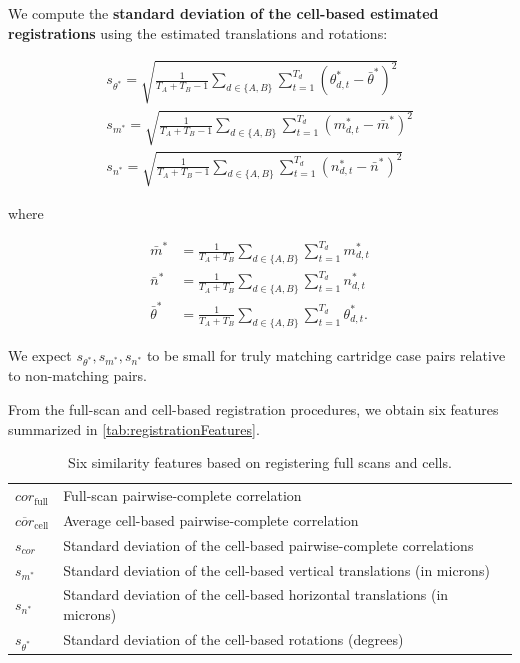 \documentclass[reprint]{JASA}
\begin{document}
We compute the \textbf{standard deviation of the cell-based estimated
registrations} using the estimated translations and rotations:

\begin{align*}
s_{\theta^*} =  \sqrt{\frac{1}{T_A + T_B - 1} \sum_{d \in \{A,B\}} \sum_{t=1}^{T_d} (\theta^*_{d,t} - \bar{\theta}^*)^2} \\
s_{m^*} =  \sqrt{\frac{1}{T_A + T_B - 1} \sum_{d \in \{A,B\}} \sum_{t=1}^{T_d} (m^*_{d,t} - \bar{m}^*)^2} \\
s_{n^*} = \sqrt{\frac{1}{T_A + T_B - 1} \sum_{d \in \{A,B\}} \sum_{t=1}^{T_d} (n^*_{d,t} - \bar{n}^*)^2}
\end{align*}

where

\begin{align*}
\bar{m}^* &= \frac{1}{T_A + T_B} \sum_{d \in \{A,B\}}\sum_{t=1}^{T_d} m^*_{d,t} \\
\bar{n}^* &= \frac{1}{T_A + T_B} \sum_{d \in \{A,B\}} \sum_{t=1}^{T_d} n^*_{d,t} \\
\bar{\theta}^* &= \frac{1}{T_A + T_B} \sum_{d \in \{A,B\}} \sum_{t=1}^{T_d} \theta^*_{d,t}.
\end{align*}

We expect \(s_{\theta^*}, s_{m^*},s_{n^*}\) to be small for truly
matching cartridge case pairs relative to non-matching pairs.

From the full-scan and cell-based registration procedures, we obtain six
features summarized in \autoref{tab:registrationFeatures}.

\begin{table}[htbp]
\centering
\begin{tabular}{p{.11\linewidth} p{.7\linewidth}}
$cor_{\text{full}}$ & Full-scan pairwise-complete correlation \\
$\overline{cor}_{\text{cell}}$ & Average cell-based pairwise-complete correlation \\
$s_{cor}$ & Standard deviation of the cell-based pairwise-complete correlations \\
$s_{m^*}$ & Standard deviation of the cell-based vertical translations (in microns) \\
$s_{n^*}$ & Standard deviation of the cell-based horizontal translations (in microns) \\
$s_{\theta^*}$ & Standard deviation of the cell-based rotations (degrees)
\end{tabular}
\caption{Six similarity features based on registering full scans and cells.}
\label{tab:registrationFeatures}
\end{table}
\end{document}
